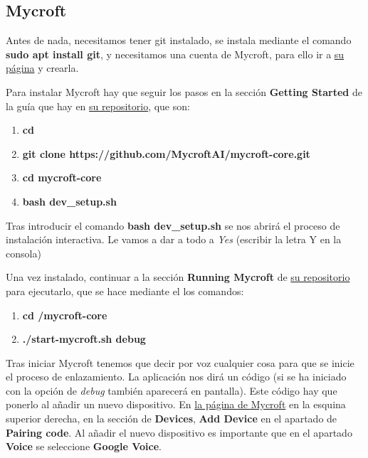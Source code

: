 \subsection{Mycroft}
Antes de nada, necesitamos tener git instalado, se instala mediante el comando \textbf{sudo apt install git}, y necesitamos una cuenta de Mycroft, para ello ir a \href{https://mycroft.ai/}{su página} y crearla.

 

Para instalar Mycroft hay que seguir los pasos en la sección \textbf{Getting Started} de la guía que hay en \href{https://github.com/MycroftAI/mycroft-core}{su repositorio}, que son:
\begin{enumerate}
	\item \textbf{cd \detokenize{~}}
	\item \textbf{git clone https://github.com/MycroftAI/mycroft-core.git}
	\item \textbf{cd mycroft-core}
	\item \textbf{bash dev\_setup.sh}
\end{enumerate}

Tras introducir el comando \textbf{bash dev\_setup.sh} se nos abrirá el proceso de instalación interactiva. Le vamos a dar a todo a \textit{Yes} (escribir la letra Y en la consola) 

Una vez instalado, continuar a la sección \textbf{Running Mycroft} de \href{https://github.com/MycroftAI/mycroft-core}{su repositorio} para ejecutarlo, que se hace mediante el los comandos:
\begin{enumerate}
	\item \textbf{cd \detokenize{~}/mycroft-core}
	\item \textbf{./start-mycroft.sh debug}
\end{enumerate}

Tras iniciar Mycroft tenemos que decir por voz cualquier cosa para que se inicie el proceso de enlazamiento. La aplicación nos dirá un código (si se ha iniciado con la opción de \textit{debug} también aparecerá en pantalla). Este código hay que ponerlo al añadir un nuevo dispositivo. En \href{https://home.mycroft.ai}{la página de Mycroft} en la esquina superior derecha, en la sección de \textbf{Devices}, \textbf{Add Device} en el apartado de \textbf{Pairing code}. Al añadir el nuevo dispositivo es importante que en el apartado \textbf{Voice} se seleccione \textbf{Google Voice}.

